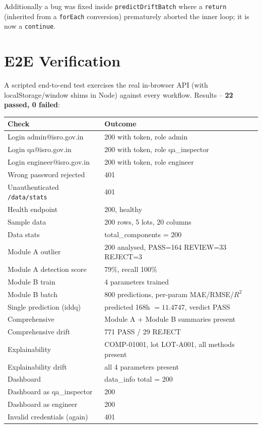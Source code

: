 \documentclass[11pt,a4paper]{article}
\newcommand{\code}[1]{\texttt{\small #1}}
\begin{document}
Additionally a bug was fixed inside \code{predictDriftBatch} where a
\code{return} (inherited from a \code{forEach} conversion) prematurely aborted the inner loop;
it is now a \code{continue}.

\section{E2E Verification}
\label{sec:e2e}

A scripted end-to-end test exercises the real in-browser API (with localStorage/window shims in
Node) against every workflow. Results -- \textbf{22 passed, 0 failed}:

\begin{longtable}{@{}l l@{}}
  \toprule
  \textbf{Check} & \textbf{Outcome} \\
  \midrule
  Login admin@isro.gov.in & 200 with token, role admin \\
  Login qa@isro.gov.in    & 200 with token, role qa\_inspector \\
  Login engineer@isro.gov.in & 200 with token, role engineer \\
  Wrong password rejected & 401 \\
  Unauthenticated \code{/data/stats} & 401 \\
  Health endpoint & 200, healthy \\
  Sample data & 200 rows, 5 lots, 20 columns \\
  Data stats & total\_components = 200 \\
  Module A outlier & 200 analysed, PASS=164 REVIEW=33 REJECT=3 \\
  Module A detection score & 79\%, recall 100\% \\
  Module B train & 4 parameters trained \\
  Module B batch & 800 predictions, per-param MAE/RMSE/$R^2$ \\
  Single prediction (iddq) & predicted 168h $= 11.4747$, verdict PASS \\
  Comprehensive & Module A + Module B summaries present \\
  Comprehensive drift & 771 PASS / 29 REJECT \\
  Explainability & COMP-01001, lot LOT-A001, all methods present \\
  Explainability drift & all 4 parameters present \\
  Dashboard & data\_info total = 200 \\
  Dashboard as qa\_inspector & 200 \\
  Dashboard as engineer & 200 \\
  Invalid credentials (again) & 401 \\
  \bottomrule
\end{longtable}
\end{document}
